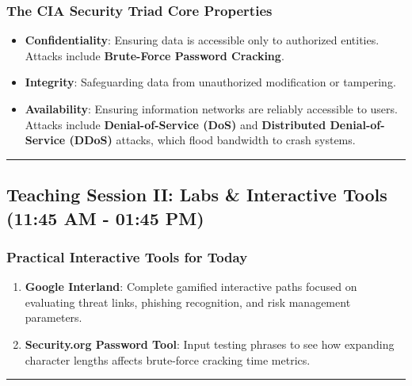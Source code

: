 \documentclass[12pt,openany]{book}
\begin{document}
\subsubsection*{The CIA Security Triad Core Properties}


\begin{itemize}

  \item \textbf{Confidentiality}: Ensuring data is accessible only to authorized entities. Attacks include \textbf{Brute-Force Password Cracking}.

  \item \textbf{Integrity}: Safeguarding data from unauthorized modification or tampering.

  \item \textbf{Availability}: Ensuring information networks are reliably accessible to users. Attacks include \textbf{Denial-of-Service (DoS)} and \textbf{Distributed Denial-of-Service (DDoS)} attacks, which flood bandwidth to crash systems.

\end{itemize}


\medskip\noindent\rule{\linewidth}{0.4pt}\medskip

\medskip

\subsection*{Teaching Session II: Labs \& Interactive Tools (11:45 AM - 01:45 PM)}


\subsubsection*{Practical Interactive Tools for Today}


\begin{enumerate}

  \item \textbf{Google Interland}: Complete gamified interactive paths focused on evaluating threat links, phishing recognition, and risk management parameters.

  \item \textbf{Security.org Password Tool}: Input testing phrases to see how expanding character lengths affects brute-force cracking time metrics.

\end{enumerate}


\medskip\noindent\rule{\linewidth}{0.4pt}\medskip
\end{document}
